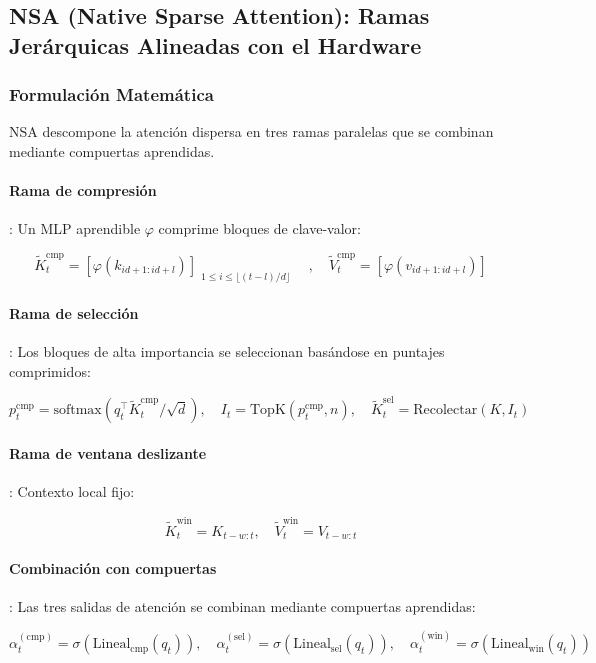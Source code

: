\subsection{NSA (Native Sparse Attention): Ramas Jerárquicas Alineadas con el Hardware}

\subsubsection{Formulación Matemática}

NSA \citep{yuan_nsa_2025} descompone la atención dispersa en tres ramas paralelas que se combinan mediante compuertas aprendidas.

\paragraph{Rama de compresión}: Un MLP aprendible $\varphi$ comprime bloques de clave-valor:

\[
\tilde{K}_t^{\text{cmp}} = \left[\varphi(k_{id+1:id+l})\right]_{\substack{1 \leq i \leq \lfloor(t-l)/d\rfloor}} \quad, \quad \tilde{V}_t^{\text{cmp}} = \left[\varphi(v_{id+1:id+l})\right]
\]

\paragraph{Rama de selección}: Los bloques de alta importancia se seleccionan basándose en puntajes comprimidos:

\[
p_t^{\text{cmp}} = \text{softmax}(q_t^\top \tilde{K}_t^{\text{cmp}} / \sqrt{d}), \quad I_t = \mathrm{TopK}(p_t^{\text{cmp}}, n), \quad \tilde{K}_t^{\text{sel}} = \mathrm{Recolectar}(K, I_t)
\]

\paragraph{Rama de ventana deslizante}: Contexto local fijo:

\[
\tilde{K}_t^{\text{win}} = K_{t-w:t}, \quad \tilde{V}_t^{\text{win}} = V_{t-w:t}
\]

\paragraph{Combinación con compuertas}: Las tres salidas de atención se combinan mediante compuertas aprendidas:

\[
\alpha_t^{(\text{cmp})} = \sigma(\text{Lineal}_\text{cmp}(q_t)), \quad \alpha_t^{(\text{sel})} = \sigma(\text{Lineal}_\text{sel}(q_t)), \quad \alpha_t^{(\text{win})} = \sigma(\text{Lineal}_\text{win}(q_t))
\]

